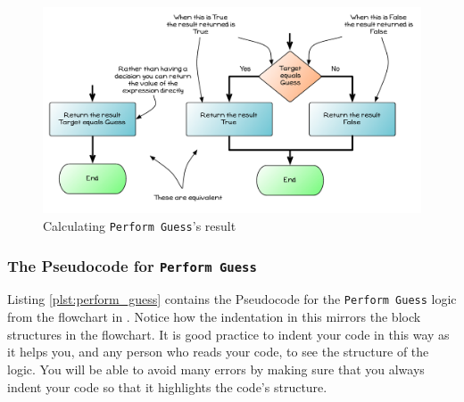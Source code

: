 \begin{figure}[htbp]
   \centering
   \includegraphics[width=\textwidth]{./topics/control-flow/diagrams/PerformGuess6} 
   \caption{Calculating \texttt{Perform Guess}'s result}
   \label{fig:perform-guess-6}
\end{figure}






\clearpage
\subsubsection{The Pseudocode for \texttt{Perform Guess}} %
\label{ssub:the_pseudocode_for_perform_guess}

Listing \ref{plst:perform_guess} contains the Pseudocode for the \texttt{Perform Guess} logic from the flowchart in . Notice how the indentation in this mirrors the block structures in the flowchart. It is good practice to indent your code in this way as it helps you, and any person who reads your code, to see the structure of the logic. You will be able to avoid many errors by making sure that you always indent your code so that it highlights the code's structure.

